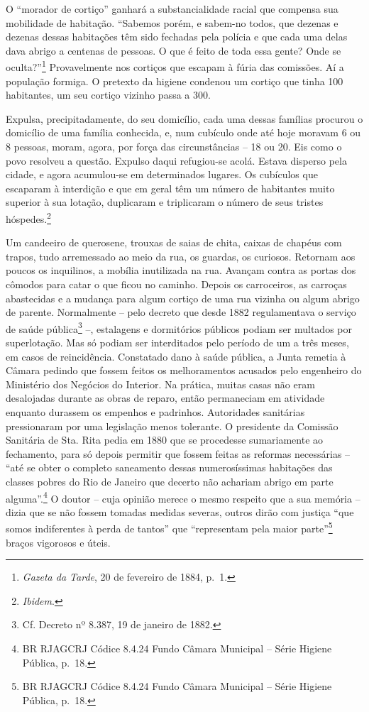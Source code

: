 O ``morador de cortiço'' ganhará a substancialidade racial que compensa
sua mobilidade de habitação. ``Sabemos porém, e sabem-no todos, que
dezenas e dezenas dessas habitações têm sido fechadas pela polícia e que
cada uma delas dava abrigo a centenas de pessoas. O que é feito de toda
essa gente? Onde se oculta?''\footnote{\emph{Gazeta da Tarde}, 20 de
  fevereiro de 1884, p.~1.} Provavelmente nos cortiços que escapam à
fúria das comissões. Aí a população formiga. O pretexto da higiene
condenou um cortiço que tinha 100 habitantes, um seu cortiço vizinho
passa a 300.

Expulsa, precipitadamente, do seu domicílio, cada uma dessas famílias
procurou o domicílio de uma família conhecida, e, num cubículo onde até
hoje moravam 6 ou 8 pessoas, moram, agora, por força das circunstâncias
-- 18 ou 20. Eis como o povo resolveu a questão. Expulso daqui
refugiou-se acolá. Estava disperso pela cidade, e agora acumulou-se em
determinados lugares. Os cubículos que escaparam à interdição e que em
geral têm um número de habitantes muito superior à sua lotação,
duplicaram e triplicaram o número de seus tristes hóspedes.\footnote{\emph{Ibidem}.}

Um candeeiro de querosene, trouxas de saias de chita, caixas de chapéus
com trapos, tudo arremessado ao meio da rua, os guardas, os curiosos.
Retornam aos poucos os inquilinos, a mobília inutilizada na rua. Avançam
contra as portas dos cômodos para catar o que ficou no caminho. Depois
os carroceiros, as carroças abastecidas e a mudança para algum cortiço
de uma rua vizinha ou algum abrigo de parente. Normalmente -- pelo
decreto que desde 1882 regulamentava o serviço de saúde
pública\footnote{Cf. Decreto nº 8.387, 19 de janeiro de 1882.} --,
estalagens e dormitórios públicos podiam ser multados por superlotação.
Mas só podiam ser interditados pelo período de um a três meses, em casos
de reincidência. Constatado dano à saúde pública, a Junta remetia à
Câmara pedindo que fossem feitos os melhoramentos acusados pelo
engenheiro do Ministério dos Negócios do Interior. Na prática, muitas
casas não eram desalojadas durante as obras de reparo, então permaneciam
em atividade enquanto durassem os empenhos e padrinhos. Autoridades
sanitárias pressionaram por uma legislação menos tolerante. O presidente
da Comissão Sanitária de Sta. Rita pedia em 1880 que se procedesse
sumariamente ao fechamento, para só depois permitir que fossem feitas as
reformas necessárias -- ``até se obter o completo saneamento dessas
numerosíssimas habitações das classes pobres do Rio de Janeiro que
decerto não achariam abrigo em parte alguma''.\footnote{BR RJAGCRJ
  Códice 8.4.24 Fundo Câmara Municipal -- Série Higiene Pública, p.~18.}
O doutor -- cuja opinião merece o mesmo respeito que a sua memória --
dizia que se não fossem tomadas medidas severas, outros dirão com
justiça ``que somos indiferentes à perda de tantos'' que ``representam
pela maior parte''\footnote{BR RJAGCRJ Códice 8.4.24 Fundo Câmara
  Municipal -- Série Higiene Pública, p.~18.} braços vigorosos e úteis.

